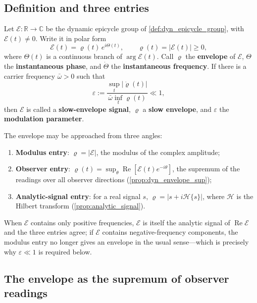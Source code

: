 \subsection{Definition and three entries}

\begin{definition}\label{def:dyn_envelope}
Let $\mathcal E:\mathbb R\to\mathbb C$ be the dynamic epicycle group of \cref{def:dyn_epicycle_group}, with $\mathcal E(t)\neq0$. Write it in polar form
\[
\mathcal E(t)=\varrho(t)\,e^{i\Theta(t)},\qquad \varrho(t)=|\mathcal E(t)|\ge0,
\]
where $\Theta(t)$ is a continuous branch of $\arg\mathcal E(t)$. Call $\varrho$ the \textbf{envelope} of $\mathcal E$, $\Theta$ the \textbf{instantaneous phase}, and $\dot\Theta$ the \textbf{instantaneous frequency}. If there is a carrier frequency $\bar\omega>0$ such that
\[
\varepsilon:=\frac{\sup_{t}|\dot\varrho(t)|}{\bar\omega\inf_{t}\varrho(t)}\ll1,
\]
then $\mathcal E$ is called a \textbf{slow-envelope signal}, $\varrho$ a \textbf{slow envelope}, and $\varepsilon$ the \textbf{modulation parameter}.
\end{definition}

\begin{remark}\label{rem:dyn_envelope_three_entries}
The envelope may be approached from three angles:
\begin{enumerate}[label=(\roman*)]
    \item \textbf{Modulus entry}: $\varrho=|\mathcal E|$, the modulus of the complex amplitude;
    \item \textbf{Observer entry}: $\varrho(t)=\sup_{\theta}\operatorname{Re}[\mathcal E(t)e^{-i\theta}]$, the supremum of the readings over all observer directions (\cref{prop:dyn_envelope_sup});
    \item \textbf{Analytic-signal entry}: for a real signal $s$, $\varrho=|s+i\mathcal H\{s\}|$, where $\mathcal H$ is the Hilbert transform (\cref{prop:analytic_signal}).
\end{enumerate}
When $\mathcal E$ contains only positive frequencies, $\mathcal E$ is itself the analytic signal of $\operatorname{Re}\mathcal E$ and the three entries agree; if $\mathcal E$ contains negative-frequency components, the modulus entry no longer gives an envelope in the usual sense---which is precisely why $\varepsilon\ll1$ is required below.
\end{remark}

\subsection{The envelope as the supremum of observer readings}

